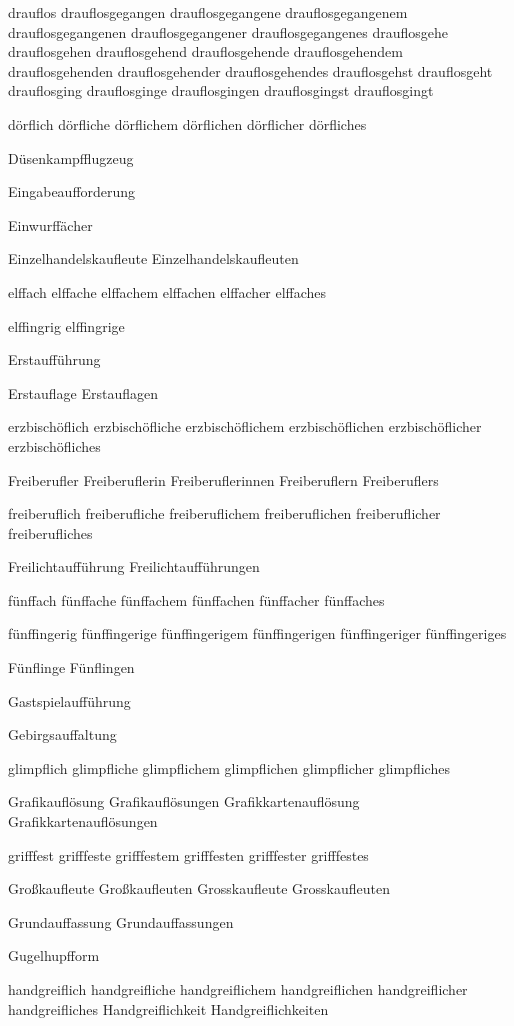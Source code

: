 drauflos drauflosgegangen drauflosgegangene drauflosgegangenem drauflosgegangenen drauflosgegangener drauflosgegangenes drauflosgehe drauflosgehen drauflosgehend drauflosgehende drauflosgehendem drauflosgehenden drauflosgehender drauflosgehendes drauflosgehst drauflosgeht drauflosging drauflosginge drauflosgingen drauflosgingst drauflosgingt

dörflich dörfliche dörflichem dörflichen dörflicher dörfliches

Düsenkampfflugzeug

Eingabeaufforderung

Einwurffächer

Einzelhandelskaufleute Einzelhandelskaufleuten

elffach elffache elffachem elffachen elffacher elffaches

elffingrig elffingrige

Erstaufführung

Erstauflage
Erstauflagen

erzbischöflich erzbischöfliche erzbischöflichem erzbischöflichen erzbischöflicher erzbischöfliches

Freiberufler Freiberuflerin Freiberuflerinnen Freiberuflern Freiberuflers

freiberuflich freiberufliche freiberuflichem freiberuflichen freiberuflicher freiberufliches

Freilichtaufführung Freilichtaufführungen

fünffach fünffache fünffachem fünffachen fünffacher fünffaches

fünffingerig fünffingerige fünffingerigem fünffingerigen fünffingeriger fünffingeriges

Fünflinge Fünflingen

Gastspielaufführung

Gebirgsauffaltung

glimpflich glimpfliche glimpflichem glimpflichen glimpflicher glimpfliches

Grafikauflösung Grafikauflösungen Grafikkartenauflösung Grafikkartenauflösungen

grifffest grifffeste grifffestem grifffesten grifffester grifffestes

Großkaufleute Großkaufleuten %
Grosskaufleute Grosskaufleuten

Grundauffassung Grundauffassungen

Gugelhupfform

handgreiflich handgreifliche handgreiflichem handgreiflichen handgreiflicher handgreifliches Handgreiflichkeit Handgreiflichkeiten

